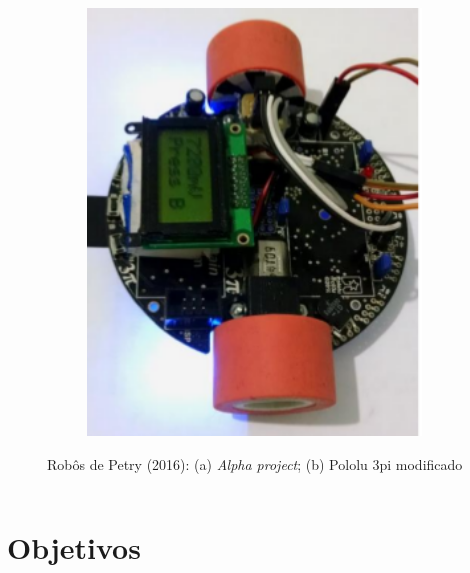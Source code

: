 \begin{frame}
\begin{columns}
\begin{figure}[h]
\begin{subfigure}[b]{0.4\textwidth}
         \includegraphics[width=1\textwidth,height=0.4\textheight]{Figuras/polulumod.png}
         \caption{\centering \label{fig:pololumarcio}}
     \end{subfigure}
	\caption{Robôs de Petry (2016): (a) \textit{Alpha project}; (b) Pololu 3pi modificado}
 \end{figure}
	
\end{columns}
\end{frame}


\section{Objetivos}

